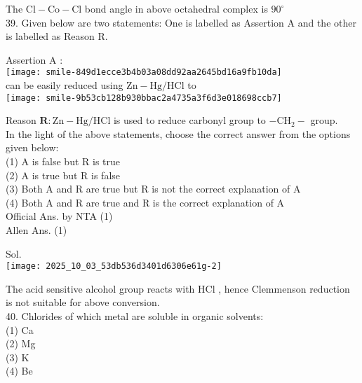 \documentclass[10pt]{article}
\begin{document}
The \(\mathrm{Cl}-\mathrm{Co}-\mathrm{Cl}\) bond angle in above octahedral complex is \(90^{\circ}\)\\
39. Given below are two statements: One is labelled as Assertion A and the other is labelled as Reason R.

Assertion A :\\
\texttt{[image: smile-849d1ecce3b4b03a08dd92aa2645bd16a9fb10da]}\\
can be easily reduced using \(\mathrm{Zn}-\mathrm{Hg} / \mathrm{HCl}\) to\\
\texttt{[image: smile-9b53cb128b930bbac2a4735a3f6d3e018698ccb7]}

Reason \(\mathbf{R}: \mathrm{Zn}-\mathrm{Hg} / \mathrm{HCl}\) is used to reduce carbonyl group to \(-\mathrm{CH}_{2}-\) group.\\
In the light of the above statements, choose the correct answer from the options given below:\\
(1) A is false but R is true\\
(2) A is true but R is false\\
(3) Both A and R are true but R is not the correct explanation of A\\
(4) Both A and R are true and R is the correct explanation of A\\
Official Ans. by NTA (1)\\
Allen Ans. (1)

Sol.\\
\texttt{[image: 2025\_10\_03\_53db536d3401d6306e61g-2]}

The acid sensitive alcohol group reacts with HCl , hence Clemmenson reduction is not suitable for above conversion.\\
40. Chlorides of which metal are soluble in organic solvents:\\
(1) Ca\\
(2) Mg\\
(3) K\\
(4) Be
\end{document}
